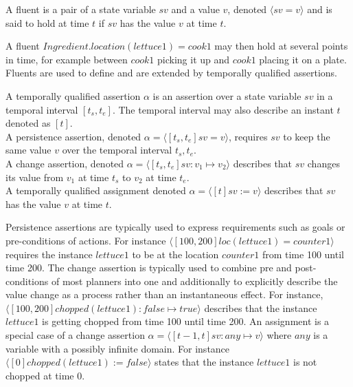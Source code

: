 \begin{definition}[Fluent]
  A fluent is a pair of a state variable $sv$ and a value $v$, denoted $\langle sv=v \rangle$ and is said to hold at time $t$ if $sv$ has the value $v$ at time $t$.
\end{definition}

A fluent $Ingredient.location(lettuce1) = cook1$ may then hold at several points in time, for example between $cook1$ picking it up and $cook1$ placing it on a plate.
Fluents are used to define and are extended by temporally qualified assertions.

\begin{definition}
  A temporally qualified assertion $\alpha$ is an assertion over a state variable $sv$ in a temporal interval $[t_s,t_e]$.
  The temporal interval may also describe an instant $t$ denoted as $[t]$.\\
  A persistence assertion, denoted $\alpha = \langle [t_s,t_e] sv=v \rangle$, requires $sv$ to keep the same value $v$ over the temporal interval $t_s,t_e$.\\
  A change assertion, denoted $\alpha = \langle [t_s,t_e] sv : v_1 \mapsto v_2 \rangle$ describes that $sv$ changes its value from $v_1$ at time $t_s$ to $v_2$ at time $t_e$. \\
  A temporally qualified assignment denoted $\alpha = \langle [t] sv := v \rangle$ describes that $sv$ has the value $v$ at time $t$.
\end{definition}

Persistence assertions are typically used to express requirements such as goals or pre-conditions of actions.
For instance $\langle[100,200] loc(lettuce1) = counter1\rangle$ requires the instance $lettuce1$ to be at the location $counter1$ from time 100 until time 200.
The change assertion is typically used to combine pre and post-conditions of most planners into one and additionally to explicitly describe the value change as a process rather than an instantaneous effect.
For instance, $\langle [100,200] chopped(lettuce1) : \mathit{false} \mapsto \mathit{true} \rangle$ describes that the instance $lettuce1$ is getting chopped from time 100 until time 200.
An assignment is a special case of a change assertion $\alpha = \langle [t-1,t] sv: any \mapsto v \rangle$ where $any$ is a variable with a possibly infinite domain.
For instance $\langle [0] chopped(lettuce1) := \mathit{false} \rangle$ states that the instance $lettuce1$ is not chopped at time 0.

